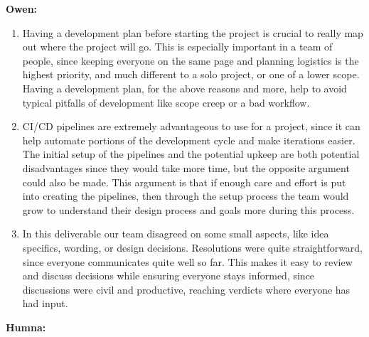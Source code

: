 \documentclass{article}
\begin{document}
\noindent \textbf{Owen:}

\begin{enumerate}
	\item Having a development plan before starting the project is crucial to really 
	map out where the project will go. This is especially important in a team of 
	people, since keeping everyone on the same page and planning logistics is the 
	highest priority, and much different to a solo project, or one of a lower scope. 
	Having a development plan, for the above reasons and more, help to avoid 
	typical pitfalls of development like scope creep or a bad workflow.
	\item CI/CD pipelines are extremely advantageous to use for a project, since it 
	can help automate portions of the development cycle and make iterations easier. 
	The initial setup of the pipelines and the potential upkeep are both potential 
	disadvantages since they would take more time, but the opposite argument 
	could also be made. This argument is that if enough care and effort is put into 
	creating the pipelines, then through the setup process the team would grow to 
	understand their design process and goals more during this process.
	\item In this deliverable our team disagreed on some small aspects, like idea 
	specifics, wording, or design decisions. Resolutions were quite straightforward, 
	since everyone communicates quite well so far. This makes it easy to review and 	
	discuss decisions while ensuring everyone stays informed, since discussions were 
	civil and productive, reaching verdicts where everyone has had input.
\end{enumerate}

\noindent \textbf{Humna:}
\end{document}
